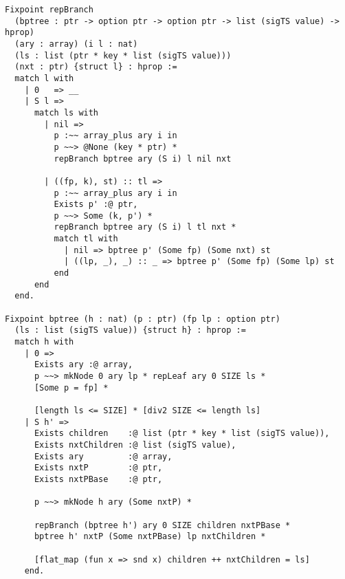 \documentclass{article}
\begin{document}
\begin{lstlisting}
Fixpoint repBranch
  (bptree : ptr -> option ptr -> option ptr -> list (sigTS value) -> hprop) 
  (ary : array) (i l : nat)
  (ls : list (ptr * key * list (sigTS value)))
  (nxt : ptr) {struct l} : hprop :=
  match l with
    | 0   => __
    | S l => 
      match ls with
        | nil =>
          p :~~ array_plus ary i in
          p ~~> @None (key * ptr) * 
          repBranch bptree ary (S i) l nil nxt

        | ((fp, k), st) :: tl =>
          p :~~ array_plus ary i in
          Exists p' :@ ptr,
          p ~~> Some (k, p') *
          repBranch bptree ary (S i) l tl nxt *
          match tl with
            | nil => bptree p' (Some fp) (Some nxt) st
            | ((lp, _), _) :: _ => bptree p' (Some fp) (Some lp) st
          end           
      end
  end.

Fixpoint bptree (h : nat) (p : ptr) (fp lp : option ptr)
  (ls : list (sigTS value)) {struct h} : hprop :=
  match h with
    | 0 =>
      Exists ary :@ array,
      p ~~> mkNode 0 ary lp * repLeaf ary 0 SIZE ls *
      [Some p = fp] *

      [length ls <= SIZE] * [div2 SIZE <= length ls]
    | S h' =>
      Exists children    :@ list (ptr * key * list (sigTS value)),
      Exists nxtChildren :@ list (sigTS value),
      Exists ary         :@ array,
      Exists nxtP        :@ ptr,
      Exists nxtPBase    :@ ptr,

      p ~~> mkNode h ary (Some nxtP) *

      repBranch (bptree h') ary 0 SIZE children nxtPBase *
      bptree h' nxtP (Some nxtPBase) lp nxtChildren *

      [flat_map (fun x => snd x) children ++ nxtChildren = ls]
    end.
\end{lstlisting}
\end{document}

